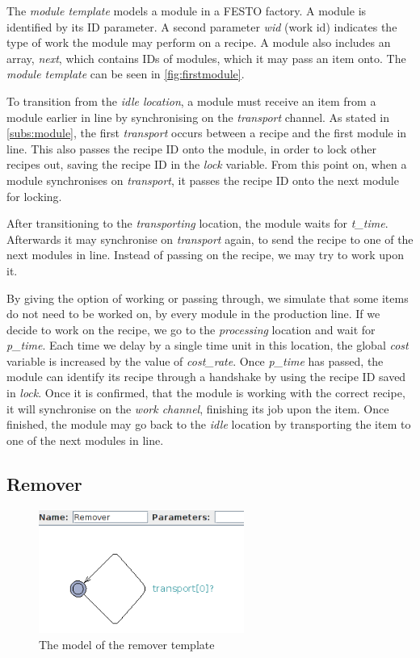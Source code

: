 The \emph{module template} models a module in a FESTO factory. A module is identified by its ID parameter. A second parameter \emph{wid} (work id) indicates the type of work the module may perform on a recipe. A module also includes an array, \emph{next}, which contains IDs of modules, which it may pass an item onto. The \emph{module template} can be seen in \cref{fig:firstmodule}.


To transition from the \emph{idle location}, a module must receive an item from a module earlier in line by synchronising on the \emph{transport} channel.
As stated in \cref{subs:module}, the first \emph{transport} occurs between a recipe and the first module in line. This also passes the recipe ID onto the module, in order to lock other recipes out, saving the recipe ID in the \emph{lock} variable. From this point on, when a module synchronises on \emph{transport}, it passes the recipe ID onto the next module for locking.

After transitioning to the \emph{transporting} location, the module waits for \emph{t\_time}. Afterwards it may synchronise on \emph{transport} again, to send the recipe to one of the next modules in line. Instead of passing on the recipe, we may try to work upon it.

By giving the option of working or passing through, we simulate that some items do not need to be worked on, by every module in the production line. If we decide to work on the recipe, we go to the \emph{processing} location and wait for \emph{p\_time}. Each time we delay by a single time unit in this location, the global \emph{cost} variable is increased by the value of \emph{cost\_rate}. Once \emph{p\_time} has passed, the module can identify its recipe through a handshake by using the recipe ID saved in \emph{lock}. Once it is confirmed, that the module is working with the correct recipe, it will synchronise on the \emph{work channel}, finishing its job upon the item. Once finished, the module may go back to the \emph{idle} location by transporting the item to one of the next modules in line.

\subsection{Remover}
\label{subs:remover}

\begin{figure}[h]
\centering
\includegraphics[width=0.6\textwidth]{images/firstremover.png}
\caption{The model of the remover template}
\label{fig:firstremover}
\end{figure}


